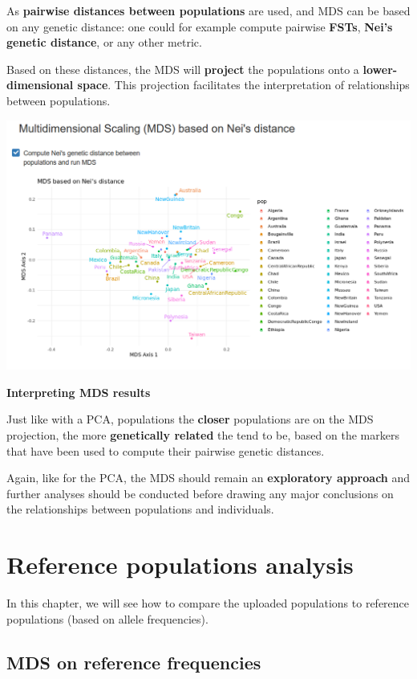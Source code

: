 \documentclass[
]{book}
\begin{document}
As \textbf{pairwise distances between populations} are used, and MDS can be based on
any genetic distance: one could for example compute pairwise \textbf{FSTs},
\textbf{Nei's genetic distance}, or any other metric.

Based on these distances, the MDS will \textbf{project} the populations onto a
\textbf{lower-dimensional space}. This projection facilitates the interpretation of
relationships between populations.

\includegraphics[width=0.8\linewidth]{img/capture_mds_1}

\begin{interpretation}
\textbf{Interpreting MDS results}

Just like with a PCA, populations the \textbf{closer} populations are on the MDS projection,
the more \textbf{genetically related} the tend to be, based on the markers that have been
used to compute their pairwise genetic distances.

Again, like for the PCA, the MDS should remain an
\textbf{exploratory approach} and further analyses should be conducted before drawing
any major conclusions on the relationships between populations and individuals.

\end{interpretation}

\hypertarget{reference-populations-analysis}{%
\chapter{Reference populations analysis}\label{reference-populations-analysis}}

In this chapter, we will see how to compare the uploaded populations to
reference populations (based on allele frequencies).

\hypertarget{mds-on-reference-frequencies}{%
\section{MDS on reference frequencies}\label{mds-on-reference-frequencies}}
\end{document}
